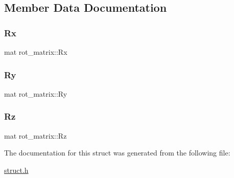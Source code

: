 \subsection{Member Data Documentation}
\mbox{\label{structrot__matrix_a4bdeed577feee6752729912f479eb3ca}} 
\subsubsection{\texorpdfstring{Rx}{Rx}}
{\footnotesize\ttfamily mat rot\+\_\+matrix\+::\+Rx}

\mbox{\label{structrot__matrix_a595f20f5a41190dae97a4d982cc85b09}} 
\subsubsection{\texorpdfstring{Ry}{Ry}}
{\footnotesize\ttfamily mat rot\+\_\+matrix\+::\+Ry}

\mbox{\label{structrot__matrix_a6205c56254ef39070a28c99d53e532ba}} 
\subsubsection{\texorpdfstring{Rz}{Rz}}
{\footnotesize\ttfamily mat rot\+\_\+matrix\+::\+Rz}



The documentation for this struct was generated from the following file\+:\begin{DoxyCompactItemize}
\item 
\hyperlink{struct_8h}{struct.\+h}\end{DoxyCompactItemize}
